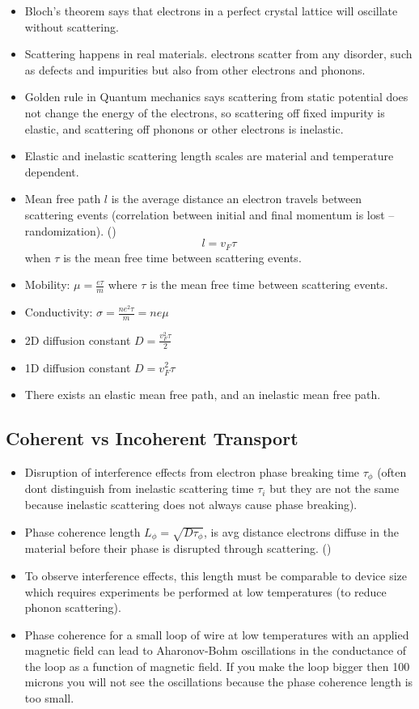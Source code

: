 \begin{itemize}
    \item Bloch's theorem says that electrons in a perfect crystal lattice will oscillate without scattering.
    \item Scattering happens in real materials. electrons scatter from any disorder, such as defects and impurities but also from other electrons and phonons.
    \item Golden rule in Quantum mechanics says scattering from static potential does not change the energy of the electrons, so scattering off fixed impurity is elastic, and scattering off phonons or other electrons is inelastic.
    \item Elastic and inelastic scattering length scales are material and temperature dependent.
    \item Mean free path $l$ is the average distance an electron travels between scattering events (correlation between initial and final momentum is lost -- randomization). ()
          \[   l = v_F \tau \]
          when $\tau$ is the mean free time between scattering events.
    \item Mobility: $\mu = \frac{e \tau}{m}$ where $\tau$ is the mean free time between scattering events.
    \item Conductivity: $\sigma = \frac{n e^2 \tau}{m} = n e \mu$
    \item 2D diffusion constant $D = \frac{v_F^2 \tau}{2} $
    \item 1D diffusion constant $D = v_F^2 \tau $
    \item There exists an elastic mean free path, and an inelastic mean free path.
\end{itemize}

\subsection{Coherent vs Incoherent Transport}

\begin{itemize}
    \item Disruption of interference effects from electron phase breaking time $\tau_\phi$ (often dont distinguish from inelastic scattering time $\tau_i$ but they are not the same because inelastic scattering does not always cause phase breaking).
    \item Phase coherence length $L_\phi = \sqrt{D \tau_\phi}$, is avg distance electrons diffuse in the material before their phase is disrupted through scattering. ()
    \item To observe interference effects, this length must be comparable to device size which requires experiments be performed at low temperatures (to reduce phonon scattering).
    \item Phase coherence for a small loop of wire at low temperatures with an applied magnetic field can lead to Aharonov-Bohm oscillations in the conductance of the loop as a function of magnetic field. If you make the loop bigger then 100 microns you will not see the oscillations because the phase coherence length is too small.
\end{itemize}

